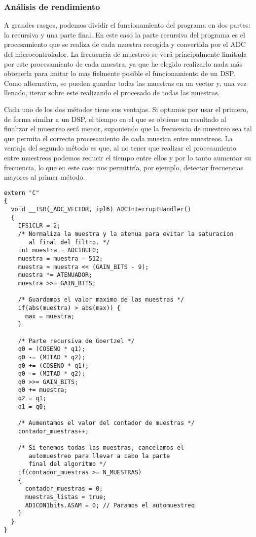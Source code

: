 
\subsubsection{Análisis de rendimiento}

A grandes rasgos, podemos dividir el funcionamiento del programa en dos partes: la recursiva y una parte final. En este caso la parte recursiva del programa es el procesamiento que se realiza de cada muestra recogida y convertida por el ADC del microcontrolador. La frecuencia de muestreo se verá principalmente limitada por este procesamiento de cada muestra, ya que he elegido realizarlo nada más obtenerla para imitar lo mas fielmente posible el funcionamiento de un DSP\@. Como alternativa, se pueden guardar todas las muestras en un vector y, una vez llenado, iterar sobre este realizando el procesado de todas las muestras.

Cada uno de los dos métodos tiene sus ventajas. Si optamos por usar el primero, de forma similar a un DSP, el tiempo en el que se obtiene un resultado al finalizar el muestreo será menor, suponiendo que la frecuencia de muestreo sea tal que permita el correcto procesamiento de cada muestra entre muestreos. La ventaja del segundo método es que, al no tener que realizar el procesamiento entre muestreos podemos reducir el tiempo entre ellos y por lo tanto aumentar su frecuencia, lo que en este caso nos permitiría, por ejemplo, detectar frecuencias mayores al primer método.

\begin{minipage}{\linewidth}
\begin{lstlisting}
extern "C"
{
  void __ISR(_ADC_VECTOR, ipl6) ADCInterruptHandler()
  {
    IFS1CLR = 2;
    /* Normaliza la muestra y la atenua para evitar la saturacion
       al final del filtro. */
    int muestra = ADC1BUF0;
    muestra = muestra - 512;
    muestra = muestra << (GAIN_BITS - 9);
    muestra *= ATENUADOR;
    muestra >>= GAIN_BITS;
    
    /* Guardamos el valor maximo de las muestras */
    if(abs(muestra) > abs(max)) {
      max = muestra;
    }

    /* Parte recursiva de Goertzel */
    q0 = (COSENO * q1);
    q0 -= (MITAD * q2);
    q0 += (COSENO * q1);
    q0 -= (MITAD * q2);
    q0 >>= GAIN_BITS;
    q0 += muestra;
    q2 = q1;
    q1 = q0;

    /* Aumentamos el valor del contador de muestras */
    contador_muestras++;

    /* Si tenemos todas las muestras, cancelamos el
       automuestreo para llevar a cabo la parte 
       final del algoritmo */
    if(contador_muestras >= N_MUESTRAS)
    {
      contador_muestras = 0;
      muestras_listas = true;
      AD1CON1bits.ASAM = 0; // Paramos el automuestreo
    }
  }
}
\end{lstlisting}
\end{minipage}

